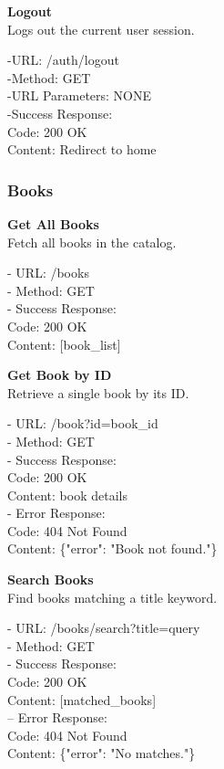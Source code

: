 \begin{flushleft}
\textbf{Logout} \\
Logs out the current user session.

-URL: /auth/logout \\
-Method: GET \\
-URL Parameters: NONE \\
-Success Response: \\
Code: 200 OK \\
Content: Redirect to home
\end{flushleft}

\subsubsection*{Books}

\textbf{Get All Books} \\
Fetch all books in the catalog.

- URL: /books \\
- Method: GET \\
- Success Response: \\
Code: 200 OK \\
Content: [book\_list]

\begin{flushleft}
\textbf{Get Book by ID} \\
Retrieve a single book by its ID.

- URL: /book?id={book\_id} \\
- Method: GET \\
- Success Response: \\
Code: 200 OK \\
Content: {book details} \\
- Error Response: \\
Code: 404 Not Found \\
Content: \{"error": "Book not found."\}
\end{flushleft}

\begin{flushleft}
\textbf{Search Books} \\
Find books matching a title keyword.

- URL: /books/search?title={query} \\
- Method: GET \\
- Success Response: \\
Code: 200 OK \\
Content: [matched\_books] \\
– Error Response: \\
Code: 404 Not Found \\
Content: \{"error": "No matches."\}
\end{flushleft}

